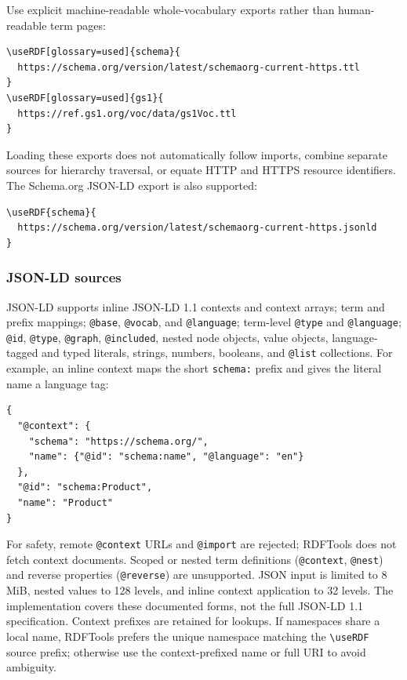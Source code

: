\documentclass[10pt,letterpaper]{article}
\begin{document}
Use explicit machine-readable whole-vocabulary exports rather than
human-readable term pages:
\begin{lstlisting}
\useRDF[glossary=used]{schema}{
  https://schema.org/version/latest/schemaorg-current-https.ttl
}
\useRDF[glossary=used]{gs1}{
  https://ref.gs1.org/voc/data/gs1Voc.ttl
}
\end{lstlisting}
Loading these exports does not automatically follow imports, combine
separate sources for hierarchy traversal, or equate HTTP and HTTPS
resource identifiers. The Schema.org JSON-LD export is also supported:
\begin{lstlisting}
\useRDF{schema}{
  https://schema.org/version/latest/schemaorg-current-https.jsonld
}
\end{lstlisting}

\subsubsection{JSON-LD sources}

JSON-LD supports inline JSON-LD 1.1 contexts and context arrays; term and
prefix mappings; \texttt{@base}, \texttt{@vocab}, and \texttt{@language};
term-level \texttt{@type} and \texttt{@language}; \texttt{@id},
\texttt{@type}, \texttt{@graph}, \texttt{@included}, nested node objects,
value objects, language-tagged and typed literals, strings, numbers,
booleans, and \texttt{@list} collections.
For example, an inline context maps the short \texttt{schema:} prefix and
gives the literal name a language tag:
\begin{lstlisting}
{
  "@context": {
    "schema": "https://schema.org/",
    "name": {"@id": "schema:name", "@language": "en"}
  },
  "@id": "schema:Product",
  "name": "Product"
}
\end{lstlisting}

For safety, remote \texttt{@context} URLs and \texttt{@import} are rejected;
RDFTools does not fetch context documents. Scoped or nested term definitions
(\texttt{@context}, \texttt{@nest}) and reverse properties
(\texttt{@reverse}) are unsupported. JSON input is limited to 8 MiB, nested
values to 128 levels, and inline context application to 32 levels. The
implementation covers these documented forms, not the full JSON-LD 1.1
specification. Context prefixes are retained for lookups. If namespaces share
a local name, RDFTools prefers the unique namespace matching the
\verb|\useRDF| source prefix; otherwise use the context-prefixed name or full
URI to avoid ambiguity.
\end{document}
